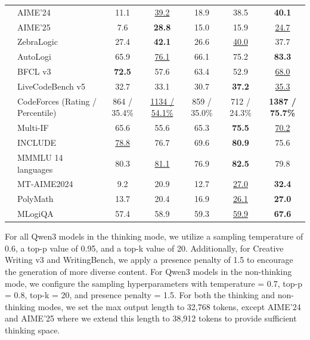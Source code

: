 \begin{table}[tbp]
{\begin{tabular}{@{}clccccc@{}}
& AIME'24 & 11.1 & \underline{39.2} & 18.9 & 38.5 & \textbf{40.1} \\
& AIME'25 & 7.6 & \textbf{28.8} & 15.0 & 15.9 & \underline{24.7} \\
& ZebraLogic & 27.4 & \textbf{42.1} & 26.6 & \underline{40.0} & 37.7 \\
& AutoLogi & 65.9 & \underline{76.1} & 66.1 & 75.2 & \textbf{83.3} \\
\midrule
{} & BFCL v3 & \textbf{72.5} & 57.6 & 63.4 & 52.9 & \underline{68.0} \\
& LiveCodeBench v5 & 32.7 & 33.1 & 30.7 & \textbf{37.2} & \underline{35.3} \\
& CodeForces {\tiny{(Rating / Percentile)}} & 864 / 35.4\% & \underline{1134 / 54.1\%} & 859 / 35.0\% & 712 / 24.3\% & \textbf{1387 / 75.7\%} \\
\midrule
{} & Multi-IF & 65.6 & 55.6 & 65.3 & \textbf{75.5} & \underline{70.2} \\
& INCLUDE & \underline{78.8} & 76.7 & 69.6 & \textbf{80.9} & 75.6 \\
& MMMLU {\tiny{14 languages}} & 80.3 & \underline{81.1} & 76.9 & \textbf{82.5} & 79.8 \\
& MT-AIME2024 & 9.2 & 20.9 & 12.7 & \underline{27.0} & \textbf{32.4} \\
& PolyMath & 13.7 & 20.4 & 16.9 & \underline{26.1} & \textbf{27.0} \\
& MLogiQA & 57.4 & 58.9 & 59.3 & \underline{59.9} & \textbf{67.6} \\
\bottomrule
\end{tabular}
}
\end{table}

For all Qwen3 models in the thinking mode, we utilize a sampling temperature of 0.6, a top-p value of 0.95, and a top-k value of 20. Additionally, for Creative Writing v3 and WritingBench, we apply a presence penalty of 1.5 to encourage the generation of more diverse content. For Qwen3 models in the non-thinking mode, we configure the sampling hyperparameters with temperature = 0.7, top-p = 0.8, top-k = 20, and presence penalty = 1.5. For both the thinking and non-thinking modes, we set the max output length to 32,768 tokens, except AIME'24 and AIME'25 where we extend this length to 38,912 tokens to provide sufficient thinking space.


